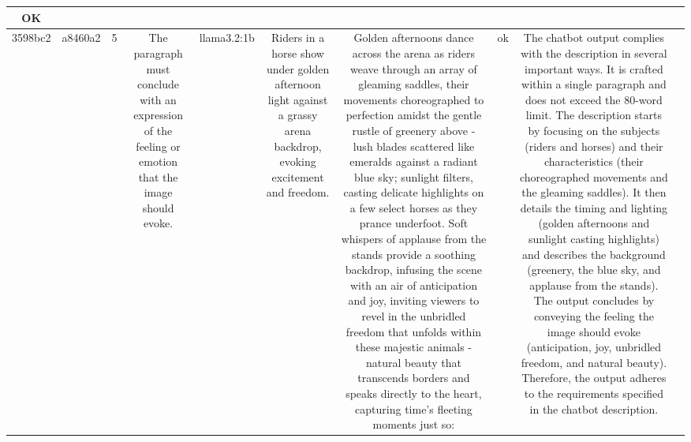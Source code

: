 \begin{table}[h!]
\begin{tabular}{|c|c|c|c|c|c|c|c|c|c|}
OK & \\
\hline
3598bc2 & a8460a2 & 5 & The paragraph must conclude with an expression of the feeling or emotion that the image should evoke. & llama3.2:1b & Riders in a horse show under golden afternoon light against a grassy arena backdrop, evoking excitement and freedom. & Golden afternoons dance across the arena as riders weave through an array of gleaming saddles, their movements choreographed to perfection amidst the gentle rustle of greenery above - lush blades scattered like emeralds against a radiant blue sky; sunlight filters, casting delicate highlights on a few select horses as they prance underfoot. Soft whispers of applause from the stands provide a soothing backdrop, infusing the scene with an air of anticipation and joy, inviting viewers to revel in the unbridled freedom that unfolds within these majestic animals - natural beauty that transcends borders and speaks directly to the heart, capturing time's fleeting moments just so: & ok & The chatbot output complies with the description in several important ways. It is crafted within a single paragraph and does not exceed the 80-word limit. The description starts by focusing on the subjects (riders and horses) and their characteristics (their choreographed movements and the gleaming saddles). It then details the timing and lighting (golden afternoons and sunlight casting highlights) and describes the background (greenery, the blue sky, and applause from the stands). The output concludes by conveying the feeling the image should evoke (anticipation, joy, unbridled freedom, and natural beauty). Therefore, the output adheres to the requirements specified in the chatbot description.


\end{tabular}
\end{table}
